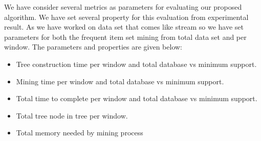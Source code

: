 %
We have consider several metrics as parameters for evaluating our proposed algorithm. We have set several property for this evaluation from experimental result. As we have worked on data set that comes like stream so we have set parameters for both the frequent item set mining from total data set and per window. The parameters and properties are given below:

\begin{itemize}
\item Tree construction time per window and total database vs minimum support.
\item Mining time per window and total database vs minimum support.
\item Total time to complete per window and total database vs minimum support.
\item Total tree node in tree per window.
\item Total memory needed by mining process
\end{itemize}
%